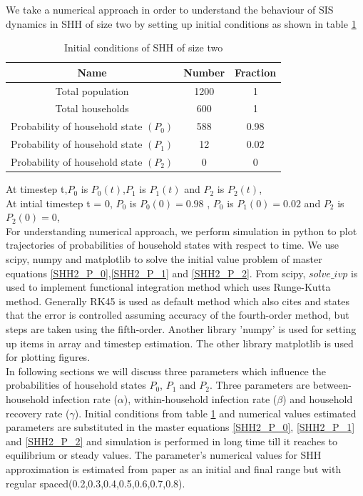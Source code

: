 \documentclass[paper=a4, fontsize=11pt, twoside, BCOR=12mm, parskip=full, listof=totoc]{scrreprt}
\begin{document}
{We take a numerical approach in order to understand the behaviour of SIS dynamics in SHH of size two by setting up initial conditions as shown in table \ref{Initial conditions for SHH size of two}
\begin{table}[H]
	\centering 
	\caption{Initial conditions of SHH of size two}
	\label{Initial conditions for SHH size of two}
	\begin{tabular}{ccc}
	\toprule     
     Name & Number & Fraction  \\
    \midrule
	  Total population   & 1200 & 1 \\
	  Total households   & 600  & 1 \\
	  Probability of household state $(P_0)$ & 588 & 0.98 \\
      Probability of household state $(P_1)$  & 12 & 0.02 \\
      Probability of household state $(P_2)$  &  0 & 0 \\
	\bottomrule
	\end{tabular}
\end{table}
At timestep t,$P_0$ is $P_0(t)$,$P_1$ is $P_1(t)$ and $P_2$ is $P_2(t)$,\\ 
At intial timestep t = 0, $P_0$ is $P_0(0)= 0.98$ , $P_0$ is $P_1(0)=0.02$  and  $P_2$ is $P_2(0)=0$,\\ 
For understanding numerical approach, we perform simulation in python to plot trajectories of probabilities of household states with respect to time. We use scipy, numpy and matplotlib to solve the initial value problem of master equations \ref{SHH2_P_0},\ref{SHH2_P_1} and \ref{SHH2_P_2}. From scipy, $solve\_ivp$ is used to implement functional integration method which uses Runge-Kutta method. Generally RK45\cite{solveivp} is used as default method which also cites \cite{dormand1980family} and states that the error is controlled assuming accuracy of the fourth-order method, but steps are taken using the fifth-order. Another library 'numpy' is used for setting up items in array \cite{numpyarray} and timestep \cite{numpylinspace} estimation. The other library matplotlib \cite{matplotlibpyplot} is used for plotting figures.\\

In following sections we will discuss three parameters which influence the probabilities of household states $ P_0 $, $ P_1 $ and $ P_2 $. Three parameters are between-household infection rate ($\alpha$), within-household infection rate ($\beta$) and household recovery rate ($\gamma$). Initial conditions from table \ref{Initial conditions for SHH size of two} and numerical values estimated parameters are substituted in the master equations \ref{SHH2_P_0}, \ref{SHH2_P_1} and \ref{SHH2_P_2} and simulation is performed in long time till it reaches to equilibrium or steady values. The parameter's numerical values for SHH approximation is estimated from paper \cite{holmes2022approximating} as an initial and final range but with regular spaced(0.2,0.3,0.4,0.5,0.6,0.7,0.8).\\

}
\end{document}
